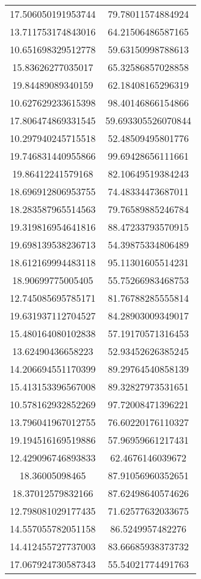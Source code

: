 \begin{table}
\begin{tabular}{cc}
17.506050191953744 & 79.78011574884924 \\
13.711753174843016 & 64.21506486587165 \\
10.651698329512778 & 59.63150998788613 \\
15.83626277035017 & 65.32586857028858 \\
19.84489089340159 & 62.18408165296319 \\
10.627629233615398 & 98.40146866154866 \\
17.806474869331545 & 59.693305526070844 \\
10.297940245715518 & 52.48509495801776 \\
19.746831440955866 & 99.69428656111661 \\
19.86412241579168 & 82.10649519384243 \\
18.696912806953755 & 74.48334473687011 \\
18.283587965514563 & 79.76589885246784 \\
19.319816954641816 & 88.47233793570915 \\
19.698139538236713 & 54.39875334806489 \\
18.612169994483118 & 95.11301605514231 \\
18.90699775005405 & 55.75266983468753 \\
12.745085695785171 & 81.76788285555814 \\
19.631937112704527 & 84.28903009349017 \\
15.480164080102838 & 57.19170571316453 \\
13.62490436658223 & 52.93452626385245 \\
14.206694551170399 & 89.29764540858139 \\
15.413153396567008 & 89.32827973531651 \\
10.578162932852269 & 97.72008471396221 \\
13.796041967012755 & 76.60220176110327 \\
19.194516169519886 & 57.96959661217431 \\
12.429096746893833 & 62.4676146039672 \\
18.36005098465 & 87.91056960352651 \\
18.37012579832166 & 87.62498640574626 \\
12.798081029177435 & 71.62577632033675 \\
14.557055782051158 & 86.5249957482276 \\
14.412455727737003 & 83.66685938373732 \\
17.067924730587343 & 55.54021774491763 \\

\end{tabular}
\end{table}

